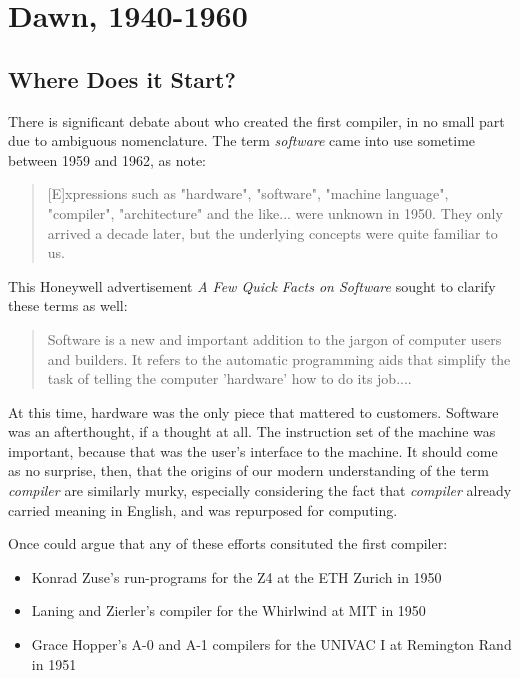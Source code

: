 \chapter{Dawn, 1940-1960}

\section{Where Does it Start?}

There is significant debate about who created the first compiler,
in no small part due to ambiguous nomenclature.
The term \textit{software} came into use sometime between 1959 and 1962,
as \citeauthor{the-first-computers-2002} note:

\begin{quotation}
[E]xpressions such as "hardware", "software", "machine language", "compiler",
"architecture" and the like... were unknown in 1950. They only arrived a decade
later, but the underlying concepts were quite familiar to us.
\cite{the-first-computers-2002}
\end{quotation}

This Honeywell advertisement \textit{A Few Quick Facts on Software} sought to clarify these terms as well:

\begin{quotation}
Software is a new and important addition to the jargon of computer users and builders.
It refers to the automatic programming aids that simplify the task of telling the computer 'hardware' how to do its job....
\end{quotation}

At this time, hardware was the only piece that mattered to customers.
Software was an afterthought, if a thought at all.
The instruction set of the machine was important, because that was the
user's interface to the machine.
It should come as no surprise, then, that the origins of our modern understanding of the
term \textit{compiler} are similarly murky, especially considering the fact that
\textit{compiler} already carried meaning in English, and was repurposed for computing.

\bigskip

Once could argue that any of these efforts consituted the first compiler:
\begin{itemize}
    \item Konrad Zuse's run-programs for the Z4 at the ETH Zurich in 1950
    \item Laning and Zierler's compiler for the Whirlwind at MIT in 1950
    \item Grace Hopper's A-0 and A-1 compilers for the UNIVAC I at Remington Rand in 1951
\end{itemize}

